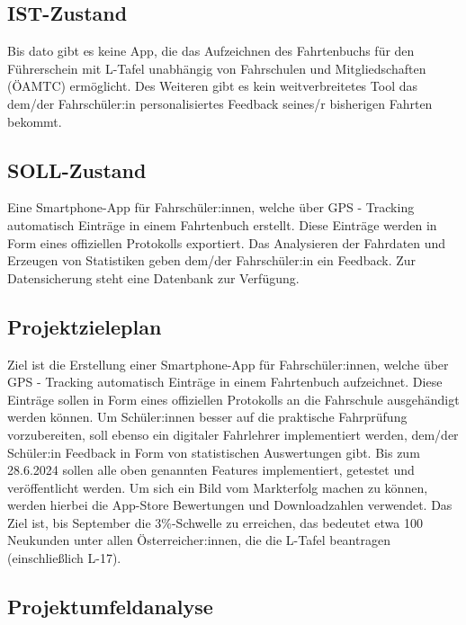 \subsection{IST-Zustand}
Bis dato gibt es keine App, die das Aufzeichnen des Fahrtenbuchs für den Führerschein mit L-Tafel unabhängig von Fahrschulen und Mitgliedschaften (ÖAMTC) ermöglicht. Des Weiteren gibt es kein weitverbreitetes Tool das dem/der Fahrschüler:in personalisiertes Feedback seines/r bisherigen Fahrten bekommt.

\subsection{SOLL-Zustand}
Eine Smartphone-App für Fahrschüler:innen, welche über GPS - Tracking automatisch Einträge in einem Fahrtenbuch erstellt. Diese Einträge werden in Form eines offiziellen Protokolls exportiert. Das Analysieren der Fahrdaten und Erzeugen von Statistiken geben dem/der Fahrschüler:in ein Feedback. Zur Datensicherung steht eine Datenbank zur Verfügung.

\subsection{Projektzieleplan}
Ziel ist die Erstellung einer Smartphone-App für Fahrschüler:innen, welche über GPS - Tracking automatisch Einträge in einem Fahrtenbuch aufzeichnet. Diese Einträge sollen in Form eines offiziellen Protokolls an die Fahrschule ausgehändigt werden können. Um Schüler:innen besser auf die praktische Fahrprüfung vorzubereiten, soll ebenso ein digitaler Fahrlehrer implementiert werden, dem/der Schüler:in Feedback in Form von statistischen Auswertungen gibt. Bis zum 28.6.2024 sollen alle oben genannten Features implementiert, getestet und veröffentlicht werden. Um sich ein Bild vom Markterfolg machen zu können, werden hierbei die App-Store Bewertungen und Downloadzahlen verwendet. Das Ziel ist, bis September die 3\%-Schwelle zu erreichen, das bedeutet etwa 100 Neukunden unter allen Österreicher:innen, die die L-Tafel beantragen (einschließlich L-17).

\subsection{Projektumfeldanalyse}

